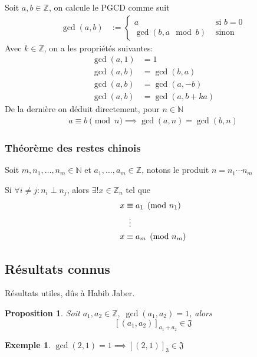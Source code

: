 \documentclass{article}
\newtheorem{proposition}{Proposition}
\newtheorem{example}{Exemple}
\begin{document}
Soit $a, b \in \mathbb{Z}$, on calcule le PGCD comme suit
\begin{align*}
    \gcd(a, b) & := \begin{cases}
        a & \text{ si $b = 0$} \\
        \gcd(b, a \mod b) & \text{ sinon}
    \end{cases}
\end{align*}
Avec $k \in \mathbb{Z}$, on a les propriétés suivantes:
\begin{align*}
    \gcd(a, 1) & = 1 \\
    \gcd(a, b) & = \gcd(b, a) \\
    \gcd(a, b) &= \gcd(a, -b) \\
    \gcd(a, b) & = \gcd(a, b + ka)
\end{align*}
De la dernière on déduit directement, pour $n \in \mathbb{N}$
\begin{align*}
        a \equiv b \pmod n \implies \gcd(a, n) = \gcd(b, n)
\end{align*}

\subsubsection{Théorème des restes chinois}

Soit $m, n_1, \dots, n_m \in \mathbb{N}$ et $a_1, \dots, a_m \in \mathbb{Z}$, notons le produit $n = n_1 \cdots n_m$

Si $\forall i \neq j : n_i \perp n_j$, alors $\exists!x \in \mathbb{Z}_n$ tel que
\begin{align*}
    x &\equiv a_1 \pmod {n_1} \\
    &\vdotswithin{\equiv} \\
    x &\equiv a_m \pmod {n_m}
\end{align*}


\subsection{Résultats connus}
Résultats utiles, dûs à Habib Jaber.

\begin{proposition}
    Soit $a_1, a_2 \in \mathbb{Z},\; \gcd(a_1, a_2) = 1$, alors
    \[ {[(a_1, a_2)]}_{a_1+a_2} \in \mathfrak{J} \]
\end{proposition}

\begin{example}
    $\gcd(2, 1) = 1 \implies {[(2, 1)]}_3 \in \mathfrak{J}$
\end{example}
\end{document}
